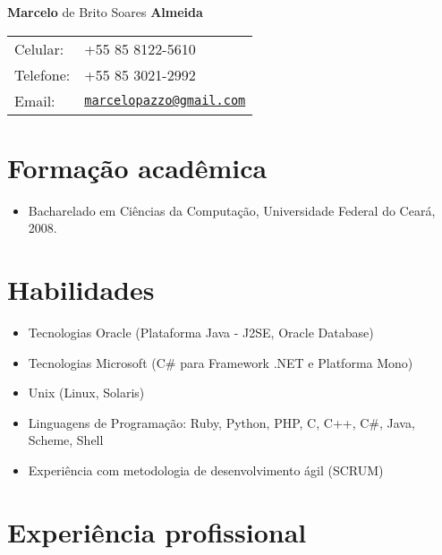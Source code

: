 \documentclass[letterpaper]{article}
\def\name{\textbf{Marcelo} de Brito Soares \textbf{Almeida}}
\begin{document}
\begin{flushright}

{\huge \name}


\vspace{0.25in}
\begin{minipage}{0.45\linewidth}
  \begin{tabular}{ll}
    Celular: & +55 85 8122-5610 \\
    Telefone: & +55 85 3021-2992 \\
    Email: & \href{mailto:marcelopazzo@gmail.com}{\tt marcelopazzo@gmail.com} \\
  \end{tabular}
\end{minipage}
\end{flushright}

\section*{Formação acadêmica}

\begin{itemize}
  \item Bacharelado em Ciências da Computação, Universidade Federal do Ceará, 2008.
\end{itemize}

\section*{Habilidades}
\begin{itemize}
  \item Tecnologias Oracle (Plataforma Java - J2SE, Oracle Database) 
  \item Tecnologias Microsoft (C\# para Framework .NET e Platforma Mono)
  \item Unix (Linux, Solaris)
  \item Linguagens de Programação: Ruby, Python, PHP, C, C++, C\#, Java, Scheme, Shell
  \item Experiência com metodologia de desenvolvimento ágil (SCRUM)
\end{itemize}

\section*{Experiência profissional}
\end{document}
